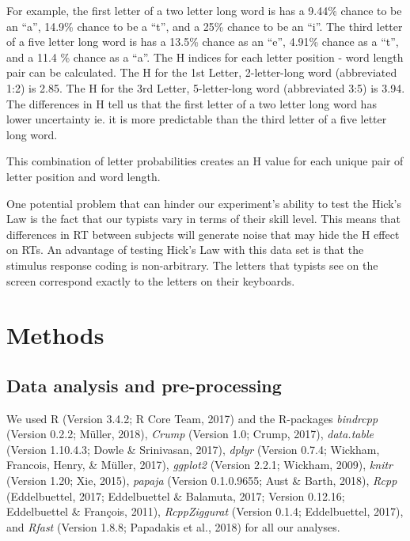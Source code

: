 \documentclass[floatsintext,man]{apa6}
\theoremstyle{definition}
\theoremstyle{definition}
\theoremstyle{definition}
\theoremstyle{remark}
\begin{document}
For example, the first letter of a two letter long word is has a 9.44\%
chance to be an \enquote{a}, 14.9\% chance to be a \enquote{t}, and a
25\% chance to be an \enquote{i}. The third letter of a five letter long
word is has a 13.5\% chance as an \enquote{e}, 4.91\% chance as a
\enquote{t}, and a 11.4 \% chance as a \enquote{a}. The H indices for
each letter position - word length pair can be calculated. The H for the
1st Letter, 2-letter-long word (abbreviated 1:2) is 2.85. The H for the
3rd Letter, 5-letter-long word (abbreviated 3:5) is 3.94. The
differences in H tell us that the first letter of a two letter long word
has lower uncertainty ie. it is more predictable than the third letter
of a five letter long word.

This combination of letter probabilities creates an H value for each
unique pair of letter position and word length.

One potential problem that can hinder our experiment's ability to test
the Hick's Law is the fact that our typists vary in terms of their skill
level. This means that differences in RT between subjects will generate
noise that may hide the H effect on RTs. An advantage of testing Hick's
Law with this data set is that the stimulus response coding is
non-arbitrary. The letters that typists see on the screen correspond
exactly to the letters on their keyboards.

\section{Methods}\label{methods}

\subsection{Data analysis and
pre-processing}\label{data-analysis-and-pre-processing}

We used R (Version 3.4.2; R Core Team, 2017) and the R-packages
\emph{bindrcpp} (Version 0.2.2; Müller, 2018), \emph{Crump} (Version
1.0; Crump, 2017), \emph{data.table} (Version 1.10.4.3; Dowle \&
Srinivasan, 2017), \emph{dplyr} (Version 0.7.4; Wickham, Francois,
Henry, \& Müller, 2017), \emph{ggplot2} (Version 2.2.1; Wickham, 2009),
\emph{knitr} (Version 1.20; Xie, 2015), \emph{papaja} (Version
0.1.0.9655; Aust \& Barth, 2018), \emph{Rcpp} (Eddelbuettel, 2017;
Eddelbuettel \& Balamuta, 2017; Version 0.12.16; Eddelbuettel \&
François, 2011), \emph{RcppZiggurat} (Version 0.1.4; Eddelbuettel,
2017), and \emph{Rfast} (Version 1.8.8; Papadakis et al., 2018) for all
our analyses.
\end{document}
